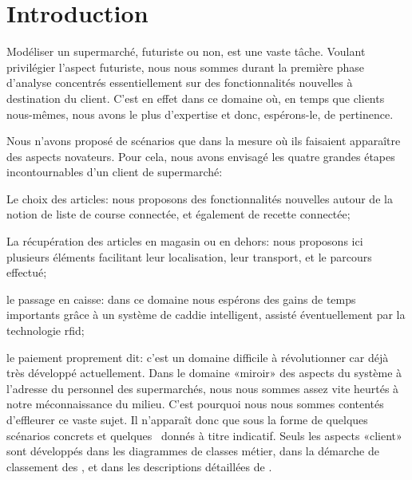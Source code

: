 \chapter{Introduction}

Modéliser un supermarché, futuriste ou non, est une vaste tâche.
Voulant privilégier l'aspect futuriste, nous nous sommes durant la première phase d'analyse concentrés essentiellement sur des fonctionnalités nouvelles à destination du client.
C'est en effet dans ce domaine où, en temps que clients nous-mêmes, nous avons le plus d'expertise et donc, espérons-le, de pertinence.\par
Nous n'avons proposé de scénarios que dans la mesure où ils faisaient apparaître des aspects novateurs.
Pour cela, nous avons envisagé les quatre grandes étapes incontournables d'un client de supermarché:
\startitemize[n]
\item Le choix des articles: nous proposons des fonctionnalités nouvelles autour de la notion de liste de course connectée, et également de recette connectée;
\item La récupération des articles en magasin ou en dehors: nous proposons ici plusieurs éléments facilitant leur localisation, leur transport, et le parcours effectué;
\item le passage en caisse: dans ce domaine nous espérons des gains de temps importants grâce à un système de caddie intelligent, assisté éventuellement par la technologie rfid;
\item le paiement proprement dit: c'est un domaine difficile à révolutionner car déjà très développé actuellement.
\stopitemize
\blank
Dans le domaine «miroir» des aspects du système à l'adresse du personnel des supermarchés, nous nous sommes assez vite heurtés à notre méconnaissance du milieu.
C'est pourquoi nous nous sommes contentés d'effleurer ce vaste sujet.
Il n'apparaît donc que sous la forme de quelques scénarios concrets et quelques \cu\ donnés à titre indicatif.
Seuls les aspects «client» sont développés dans les diagrammes de classes métier, dans la démarche de classement des \cu, et dans les descriptions détaillées de \cu.


